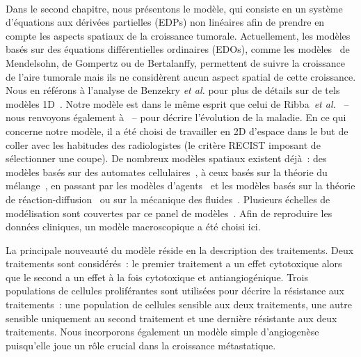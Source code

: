 \documentclass[main.tex]{subfiles}
\begin{document}
\paragraph{}
Dans le second chapitre, nous présentons le modèle, qui consiste en un système d'équations aux dérivées partielles (EDPs) non linéaires afin de prendre en compte les aspects spatiaux de la croissance tumorale. Actuellement, 
les modèles basés sur des équations différentielles ordinaires (EDOs), comme les modèles~\cite{gerlee2013model} de Mendelsohn, de Gompertz ou de 
Bertalanffy, permettent de suivre la croissance de l'aire tumorale mais ils ne considèrent aucun aspect spatial de cette croissance. Nous en référons à l'analyse de Benzekry {\it et al.} pour plus de détails sur de tels modèles 1D~\cite{benzekry2014}. 
Notre modèle est dans le même esprit que celui de Ribba~{\it et
  al.}~\cite{Ribba2006532} -- nous renvoyons également à~\cite{Iollo2012,gallinato2014} -- pour décrire l'évolution de la maladie. 
En ce qui concerne notre modèle, il a été choisi de travailler en 2D d'espace dans le but de coller avec les habitudes des radiologistes (le critère RECIST imposant de sélectionner une coupe). De nombreux modèles spatiaux existent déjà~: des modèles basés sur des automates  cellulaires~\cite{alarcon2003cellular,drasdo2003individual}, à ceux basés sur la théorie du mélange~\cite{ambrosi2002}, en passant par les modèles d'agents~\cite{mansury2002emerging} et les modèles basés sur la théorie de réaction-diffusion~\cite{rockne2009mathematical} ou sur la mécanique des fluides~\cite{Iollo2012}. Plusieurs échelles de modélisation sont couvertes par ce panel de modèles~\cite{cristini2010multiscale}. Afin de reproduire les données cliniques, un modèle macroscopique a été choisi ici. 

La principale nouveauté du modèle réside en la description des traitements. Deux traitements sont considérés~: le premier traitement a un effet cytotoxique alors que le second a un effet à la fois cytotoxique et antiangiogénique. Trois populations de cellules proliférantes sont utilisées pour décrire la résistance aux traitements~: une population de cellules sensible aux deux traitements, une autre sensible uniquement au second traitement et une dernière résistante aux deux traitements.  
Nous incorporons également un modèle simple d'angiogenèse puisqu'elle joue un rôle crucial dans la croissance métastatique.
\end{document}
